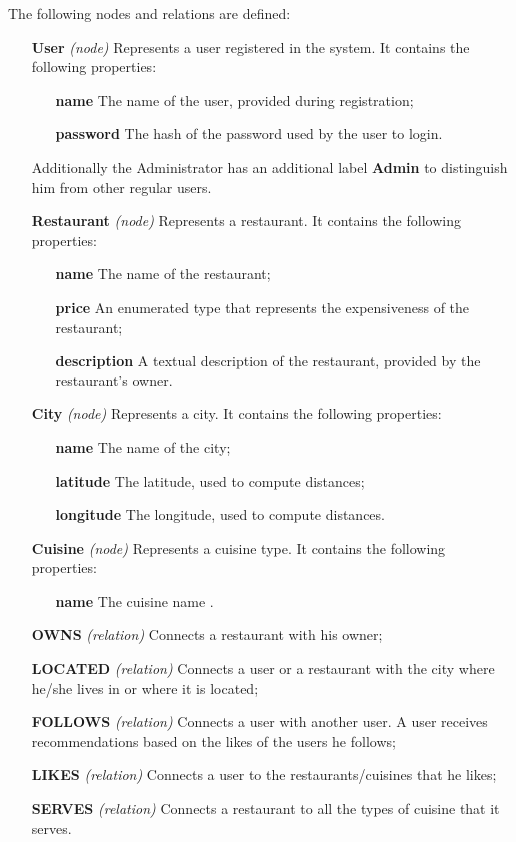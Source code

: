 The following nodes and relations are defined:
\begin{itemize}
	\item[\textbf{User}] \textit{(node)} Represents a user registered in the
		system. It contains the following properties:
		\begin{itemize}
			\item[\textbf{name}] The name of the user, provided
				during registration;
			\item[\textbf{password}] The hash of the password used
				by the user to login.
		\end{itemize}
		Additionally the Administrator has an additional label
		\textbf{Admin} to distinguish him from other regular users.
	\item[\textbf{Restaurant}] \textit{(node)} Represents a restaurant. It
		contains the following properties:
		\begin{itemize}
			\item[\textbf{name}] The name of the restaurant;
			\item[\textbf{price}] An enumerated type that represents
				the expensiveness of the restaurant;
			\item[\textbf{description}] A textual description of the
				restaurant, provided by the restaurant's owner.
		\end{itemize}
	\item[\textbf{City}] \textit{(node)} Represents a city. It contains the
		following properties:
		\begin{itemize}
			\item[\textbf{name}] The name of the city;
			\item[\textbf{latitude}] The latitude, used to compute
				distances;
			\item[\textbf{longitude}] The longitude, used to compute
				distances.
		\end{itemize}
	\item[\textbf{Cuisine}] \textit{(node)} Represents a cuisine type. It
		contains the following properties:
		\begin{itemize}
			\item[\textbf{name}] The cuisine name .
		\end{itemize}
	\item[\textbf{OWNS}] \textit{(relation)} Connects a restaurant with his
		owner;
	\item[\textbf{LOCATED}] \textit{(relation)} Connects a user or a
		restaurant with the city where he/she lives in or where it is
		located;
	\item[\textbf{FOLLOWS}] \textit{(relation)} Connects a user with another
		user. A user receives recommendations based on the likes of the
		users he follows;
	\item[\textbf{LIKES}] \textit{(relation)} Connects a user to the
		restaurants/cuisines that he likes;
	\item[\textbf{SERVES}] \textit{(relation)} Connects a restaurant to all
		the types of cuisine that it serves.
\end{itemize}

